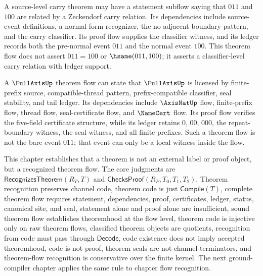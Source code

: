 \begin{example}
\label{ex:theorem-generated-zeckendorf-carry-flow}
A source-level carry theorem may have a statement subflow saying that $011$ and $100$ are related by a Zeckendorf carry relation. Its dependencies include source-event definitions, a normal-form recognizer, the no-adjacent-boundary pattern, and the carry classifier. Its proof flow supplies the classifier witness, and its ledger records both the pre-normal event $011$ and the normal event $100$. This theorem flow does not assert $011=100$ or $\hsame(011,100)$; it asserts a classifier-level carry relation with ledger support.
\end{example}

\begin{example}
\label{ex:theorem-generated-fullaxis-flow}
A $\FullAxisUp$ theorem flow can state that $\FullAxisUp$ is licensed by finite-prefix source, compatible-thread pattern, prefix-compatible classifier, seal stability, and tail ledger. Its dependencies include $\AxisNatUp$ flow, finite-prefix flow, thread flow, seal-certificate flow, and $\NameCert$ flow. Its proof flow verifies the five-field certificate structure, while its ledger retains $0$, $00$, $000$, the repeat-boundary witness, the seal witness, and all finite prefixes. Such a theorem flow is not the bare event $011$; that event can only be a local witness inside the flow.
\end{example}

\begin{remark}[Outlook]
\label{rem:theorem-generated-outlook}
This chapter establishes that a theorem is not an external label or proof object, but a recognized theorem flow. The core judgments are $\mathsf{RecognizesTheorem}(R_T,T)$ and $\mathsf{ChecksProof}(R_P,T_0,T_1,T_2)$. Theorem recognition preserves channel code, theorem code is just $\mathsf{Compile}(T)$, complete theorem flow requires statement, dependencies, proof, certificates, ledger, status, canonical site, and seal, statement alone and proof alone are insufficient, sound theorem flow establishes theoremhood at the flow level, theorem code is injective only on raw theorem flows, classified theorem objects are quotients, recognition from code must pass through $\mathsf{Decode}$, code existence does not imply accepted theoremhood, code is not proof, theorem seals are not channel terminators, and theorem-flow recognition is conservative over the finite kernel. The next ground-compiler chapter applies the same rule to chapter flow recognition.
\end{remark}
